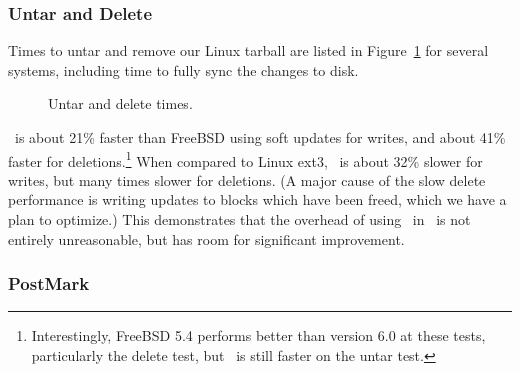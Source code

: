 \subsubsection{Untar and Delete}
\label{sec:eval:untardel}

Times to untar and remove our Linux tarball are listed in
Figure~\ref{fig:macro} for several systems, including time to fully sync
the changes to disk.

\begin{figure}[t]
\caption{\label{fig:macro} Untar and delete times.}
\end{figure}

\Kudos\ is about 21\% faster than FreeBSD using soft updates for
writes, and about 41\% faster for deletions.\footnote{Interestingly, FreeBSD 5.4
performs better than version 6.0 at these tests, particularly the delete test,
but \Kudos\ is still faster on the untar test.}
%
When compared to Linux ext3, \Kudos\ is about 32\% slower for writes, but many
times slower for deletions.
(A major cause of the slow delete performance is writing
updates to blocks which have been freed, which we have a plan to optimize.)
%
This demonstrates that the overhead of using \chdescs\ in \Kudos\ is not
entirely unreasonable, but has room for significant improvement.
%
%

\subsubsection {PostMark}
\label{sec:eval:postmark}

